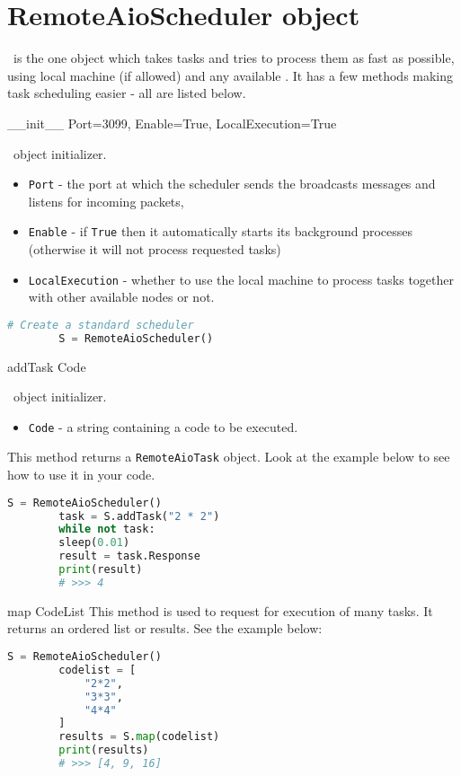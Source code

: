 \section{RemoteAioScheduler object}

\RemoteAioScheduler\ is the one object which takes tasks and tries to process them as fast as possible, using local machine (if allowed) and any available \RemoteAioNode. It has a few methods making task scheduling easier - all are listed below.

 {\_\_init\_\_} {Port=3099, Enable=True, LocalExecution=True} {
	\RemoteAioScheduler\ object initializer.
	\begin{itemize}
		\item \texttt{Port} - the port at which the scheduler sends the broadcasts messages and listens for incoming packets, 
		\item \texttt{Enable} - if \texttt{True} then it automatically starts its background processes (otherwise it will not process requested tasks)
		\item \texttt{LocalExecution} - whether to use the local machine to process tasks together with other available nodes or not.
	\end{itemize}
}
\begin{lstlisting}[language=Python]
		# Create a standard scheduler
		S = RemoteAioScheduler()
\end{lstlisting}

 {addTask} {Code} {
	\RemoteAioScheduler\ object initializer.
	\begin{itemize}
		\item \texttt{Code} - a string containing a code to be executed.
	\end{itemize}
	This method returns a \texttt{RemoteAioTask} object. Look at the example below to see how to use it in your code.
}
\begin{lstlisting}[language=Python]
		S = RemoteAioScheduler()
		task = S.addTask("2 * 2")
		while not task:
		sleep(0.01)
		result = task.Response
		print(result)
		# >>> 4
\end{lstlisting}

 {map} {CodeList} {
	This method is used to request for execution of many tasks. It returns an ordered list or results. See the example below:
}
\begin{lstlisting}[language=Python]
		S = RemoteAioScheduler()
		codelist = [
			"2*2",
			"3*3",
			"4*4"
		]
		results = S.map(codelist)
		print(results)
		# >>> [4, 9, 16]
\end{lstlisting}

